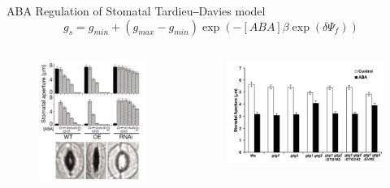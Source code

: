 \documentclass[handout]{beamer}
\begin{document}
\begin{frame}{ABA Regulation of Stomatal}
	Tardieu‒Davies model
	$$g_{s} = g_{min} + (g_{max} − g_{min} )\exp( − [ABA]\beta \exp(\delta \Psi_{f}))$$

	\vfill

	\begin{columns}
		\begin{column}{.4\linewidth}
			\begin{figure}
				\includegraphics[width=.8\linewidth]{figure/figure1.png}
			\end{figure}
		\end{column}
		
		\begin{column}{.6\linewidth}
			\begin{figure}
				\includegraphics[width=\linewidth]{figure/figure2.png}
			\end{figure}
		\end{column}
	\end{columns}
\end{frame}
\end{document}
